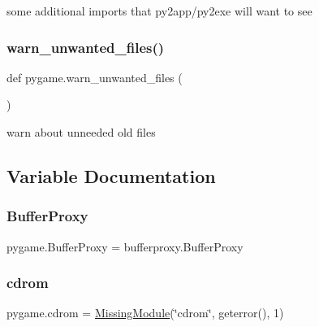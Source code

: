 \begin{DoxyVerb}some additional imports that py2app/py2exe will want to see\end{DoxyVerb}
 \mbox{\label{namespacepygame_a76d77d6c5c9eeda84168f6a5073fbea2}} 
\subsubsection{\texorpdfstring{warn\+\_\+unwanted\+\_\+files()}{warn\_unwanted\_files()}}
{\footnotesize\ttfamily def pygame.\+warn\+\_\+unwanted\+\_\+files (\begin{DoxyParamCaption}{ }\end{DoxyParamCaption})}

\begin{DoxyVerb}warn about unneeded old files\end{DoxyVerb}
 

\subsection{Variable Documentation}
\mbox{\label{namespacepygame_ab17fba45a8059db2321d998dd3fea20d}} 
\subsubsection{\texorpdfstring{Buffer\+Proxy}{BufferProxy}}
{\footnotesize\ttfamily pygame.\+Buffer\+Proxy = bufferproxy.\+Buffer\+Proxy}

\mbox{\label{namespacepygame_a4a815578de604c0b92d024a9d2a9bf90}} 
\subsubsection{\texorpdfstring{cdrom}{cdrom}}
{\footnotesize\ttfamily pygame.\+cdrom = \hyperlink{classpygame_1_1_missing_module}{Missing\+Module}(\char`\"{}cdrom\char`\"{}, geterror(), 1)}

\mbox{\label{namespacepygame_ad27cf54b626cb073b189d7171af414fb}} 
